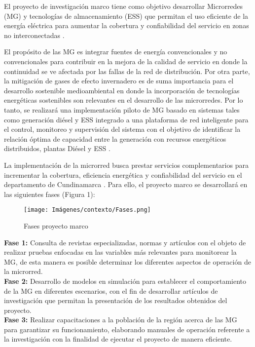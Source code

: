 El proyecto de investigación marco tiene como objetivo desarrollar Microrredes (MG) y tecnologías de almacenamiento (ESS) que permitan el uso eficiente de la energía eléctrica  para aumentar la cobertura y confiabilidad del servicio en zonas no interconectadas \cite{microgrid}.

El propósito de las MG es integrar fuentes de energía convencionales y no convencionales para contribuir en la mejora de la calidad de servicio en donde la continuidad se ve afectada por las fallas de la red de distribución. Por otra parte, la mitigación de gases de efecto invernadero es de suma importancia para el desarrollo sostenible medioambiental en donde la incorporación de tecnologías energéticas sostenibles son relevantes en el desarrollo de las microrredes. Por lo tanto, se realizará una implementación  piloto de MG basado en sistemas tales como generación diésel y ESS integrado a una plataforma de red inteligente para el control, monitoreo y supervisión del sistema con el objetivo de identificar la relación óptima de capacidad entre la generación con recursos energéticos distribuidos, plantas Diésel y ESS   \cite{microgrid}.

La implementación de la microrred busca prestar servicios complementarios para incrementar la cobertura, eficiencia energética y confiabilidad del servicio en el departamento de Cundinamarca \cite{microgrid}. Para ello, el proyecto marco se desarrollará en las siguientes fases (Figura 1):
\newpage
\begin{figure}[h!]
    \begin{center}
    \centering
    \texttt{[image: Imágenes/contexto/Fases.png]}
	\caption{ Fases proyecto marco}
    \end{center}
\end{figure}

\textbf{Fase 1: }  Consulta de revistas especializadas, normas y artículos con el objeto de realizar pruebas enfocadas en las variables más relevantes para monitorear la MG, de esta manera es posible determinar los diferentes aspectos de operación de la microrred.\\

\textbf{Fase 2: } Desarrollo de modelos en simulación para establecer el comportamiento de la MG en diferentes escenarios, con el fin de desarrollar artículos de investigación que permitan la presentación de los resultados obtenidos del proyecto.\\

\textbf{Fase 3: } Realizar capacitaciones a la población de la región acerca de las MG para garantizar su funcionamiento, elaborando manuales de operación referente a la investigación con la finalidad de ejecutar el proyecto de manera eficiente.


